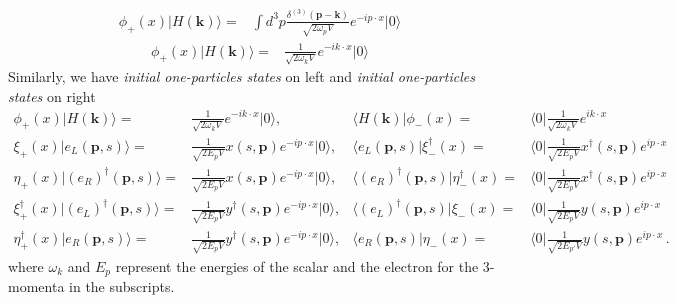 \begin{align}
\phi_+(x)|H(\mathbf{k})\rangle  
=&\int d^3p \frac{\delta^{(3)}(\mathbf{p}-\mathbf{k})}{\sqrt{2\omega_{p}V}}
 e^{-i p\cdot x }|0\rangle
\end{align}
\begin{align}
\phi_+(x)|H(\mathbf{k})\rangle  
=&\frac{1}{\sqrt{2\omega_{k}V}}e^{-i k\cdot x }|0\rangle
\end{align}
Similarly, we have  \emph{initial one-particles states} on left and \emph{initial one-particles states} on right
\begin{align}
  \label{eq:99f}
  \phi_+(x)|H(\mathbf{k})\rangle=&\frac{1}{\sqrt{2 \omega_k V}}e^{-i k\cdot x}|0\rangle,&
 \langle H(\mathbf{k})|\phi_-(x)=&\langle0|\frac{1}{\sqrt{2 \omega_k V}}e^{i k\cdot x}\nonumber\\
  \xi_+(x)|e_{L}(\mathbf{p},s)\rangle=&\frac{1}{\sqrt{2 E_p V}}x(s,\mathbf{p})e^{-i p\cdot x}|0\rangle,&
  \langle e_{L}(\mathbf{p},s)|\xi_-^{\dagger}(x)=&\langle 0|\frac{1}{\sqrt{2 E_p V}}x^{\dagger}(s,\mathbf{p})e^{i p\cdot x}\nonumber\\
  \eta_+(x)|\left( e_R \right)^{\dagger}(\mathbf{p},s)\rangle=&\frac{1}{\sqrt{2 E_{p} V}}x(s,\mathbf{p})e^{-i p\cdot x}|0\rangle,&
  \langle \left( e_R \right)^{\dagger}(\mathbf{p},s)|\eta^{\dagger}_-(x)=&\langle 0|\frac{1}{\sqrt{2 E_{p} V}}x^{\dagger}(s,\mathbf{p})e^{i p\cdot x} \nonumber\\
  \xi_+^{\dagger}(x)|\left( e_{L} \right)^{\dagger}(\mathbf{p},s)\rangle=&\frac{1}{\sqrt{2 E_p V}}y^{\dagger}(s,\mathbf{p})e^{-i p\cdot x}|0\rangle,&
  \langle\left( e_{L} \right)^{\dagger}(\mathbf{p},s)|\xi_-(x)=&\langle 0| \frac{1}{\sqrt{2 E_p V}}y(s,\mathbf{p})e^{i p\cdot x}\nonumber\\
  \eta_+^{\dagger}(x)|e_R (\mathbf{p},s)\rangle=&\frac{1}{\sqrt{2 E_{p} V}}y^{\dagger}(s,\mathbf{p})e^{-i p\cdot x}|0\rangle,&
  \langle e_R(\mathbf{p},s)|\eta_-(x)=&\langle 0|\frac{1}{\sqrt{2 E_{p'} V}}y(s,\mathbf{p})e^{i p\cdot x}
 \,.
\end{align}
where $\omega_k$ and $E_p$ represent the energies of the scalar and the electron for the 3-momenta in the subscripts.

